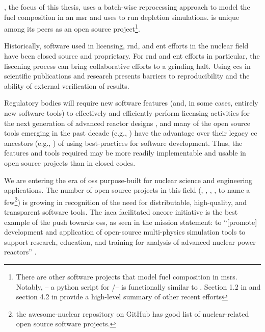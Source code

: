 \SaltProc\cite{rykhlevskii_saltproc_2018}, the focus of this thesis, uses a
batch-wise reprocessing approach to model the fuel composition in an \Gls{msr}
and uses \SerpentTWO\cite{leppanen_serpent_2014} to run depletion simulations.
\SaltProc is unique among its peers as an open source project\footnote{There are
other software projects that model fuel composition in \Gls{msr}s. Notably,
\ChemTriton\cite{betzler_molten_2017} -- a python script for \SCALE/\TRITON --
is functionally similar to \SaltProc. Section 1.2 in
\cite{rykhlevskii_fuel_2020} and section 4.2 in \cite{rykhlevskii_advanced_2018}
provide a high-level summary of other recent efforts}.

Historically, software used in licensing, \gls{rnd}, and \gls{ent} efforts in
the nuclear field have been closed source and proprietary. For \Gls{rnd} and
\Gls{ent} efforts in particular, the liscening process can bring collaborative efforts to a
grinding halt. Using \gls{cc}s
in scientific publications and research presents barriers to reproducibility and
the ability of external verification of results.
    
Regulatory bodies will require new software features (and, in some cases, entirely
new software tools) to effectively and efficiently perform licensing
activities for the next generation of advanced reactor designs
\cite{usnrc_nonlwr_2020-1}, and many of the open source tools emerging in the
past decade (e.g., \OpenMC\cite{romano_openmc_2015}) have the advantage over
their legacy \Gls{cc} ancestors (e.g., \SerpentTWO \cite{leppanen_serpent_2014})
of using best-practices for software development. Thus, the features
and tools required may be more readily implementable and usable in open source projects than
in closed codes.
    
We are entering the era of \gls{oss} purpose-built for nuclear
science and engineering applications. The number of open source projects in this
field
(\ONIX\cite{de_troullioud_de_lanversin_onix_2021}, \OpenMC,
\NJOYTWOONE\cite{noauthor_njoy21_2022}, \Cyclus\cite{noauthor_cyclus_2022}, to
name a few\footnote{the awesome-nuclear repository on GitHub
\cite{romano_awesome_2022} has good list of nuclear-related open source software
projects.}) is growing in recognition of the need for distributable,
high-quality, and transparent software tools. The
\Gls{iaea} facilitated \Gls{oncore} initiative \cite{fiorina_initiative_2021} is the best
example of the push towards \Gls{oss}, as seen in the mission
statement: to
``[promote] development and application of open-source multi-physics simulation
tools to support research, education, and training for analysis of advanced
nuclear power reactors'' \cite{iaea_open-source_2022}. 


